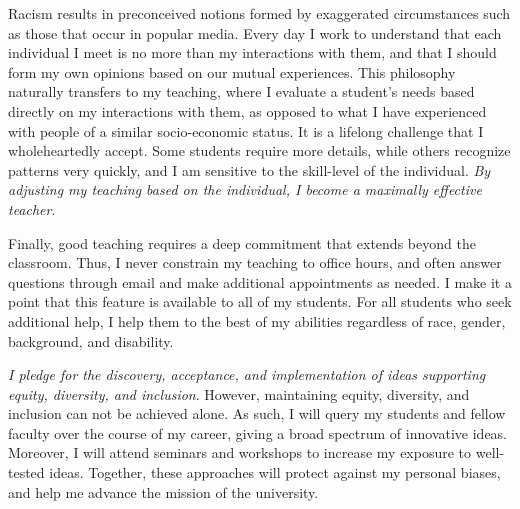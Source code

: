 \documentclass[a4paper,11pt]{article}
\begin{document}
Racism results in preconceived notions formed by exaggerated circumstances such as those that occur in popular media. Every day I work to understand that each individual I meet is no more than my interactions with them, and that I should form my own opinions based on our mutual experiences. This philosophy naturally transfers to my teaching, where I evaluate a student's needs based directly on my interactions with them, as opposed to what I have experienced with people of a similar socio-economic status. It is a lifelong challenge that I wholeheartedly accept. Some students require more details, while others recognize patterns very quickly, and I am sensitive to the skill-level of the individual. \textit{By adjusting my teaching based on the individual, I become a maximally effective teacher}.

Finally, good teaching requires a deep commitment that extends beyond the classroom. Thus, I never constrain my teaching to office hours, and often answer questions through email and make additional appointments as needed. I make it a point that this feature is available to all of my students. For all students who seek additional help, I help them to the best of my abilities regardless of race, gender, background, and disability.

\textit{I pledge for the discovery, acceptance, and implementation of ideas supporting equity, diversity, and inclusion}. However, maintaining equity, diversity, and inclusion can not be achieved alone. As such, I will query my students and fellow faculty over the course of my career, giving a broad spectrum of innovative ideas. Moreover, I will attend seminars and workshops to increase my exposure to well-tested ideas. Together, these approaches will protect against my personal biases, and help me advance the mission of the university.
\end{document}
